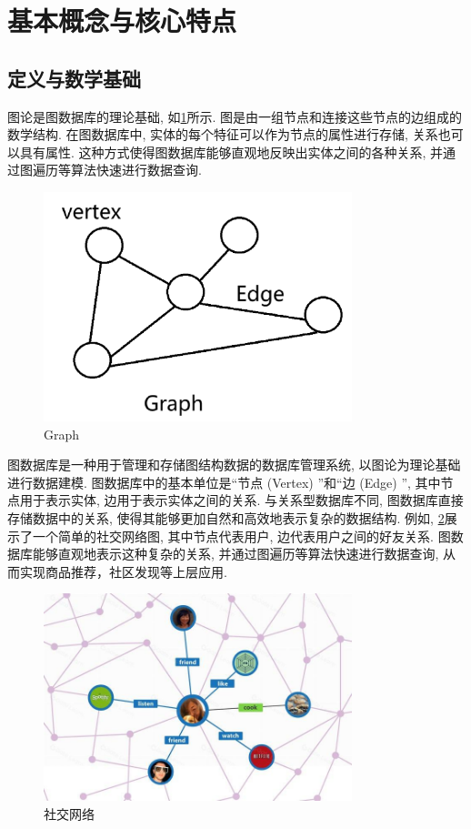 \section{基本概念与核心特点}

\subsection{定义与数学基础}
图论是图数据库的理论基础, 如\cref{fig:graph}所示. 图是由一组节点和连接这些节点的边组成的数学结构. 在图数据库中, 实体的每个特征可以作为节点的属性进行存储, 关系也可以具有属性. 这种方式使得图数据库能够直观地反映出实体之间的各种关系, 并通过图遍历等算法快速进行数据查询.

\begin{figure}[H]
	\centering
	\includegraphics[width=0.8\textwidth]{images/7.png}
	\caption{Graph}
	\label{fig:graph}
\end{figure}
图数据库是一种用于管理和存储图结构数据的数据库管理系统, 以图论为理论基础进行数据建模. 图数据库中的基本单位是“节点 (Vertex) ”和“边 (Edge) ”, 其中节点用于表示实体, 边用于表示实体之间的关系. 与关系型数据库不同, 图数据库直接存储数据中的关系, 使得其能够更加自然和高效地表示复杂的数据结构. 例如, \cref{fig:social-network}展示了一个简单的社交网络图, 其中节点代表用户, 边代表用户之间的好友关系. 图数据库能够直观地表示这种复杂的关系, 并通过图遍历等算法快速进行数据查询, 从而实现商品推荐，社区发现等上层应用.
\begin{figure}[H]
	\centering
	\includegraphics[width=0.8\textwidth]{images/8.png}
	\caption{社交网络}
	\label{fig:social-network}
\end{figure}


